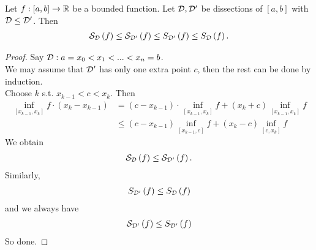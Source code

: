 \documentclass[a4paper]{article}
\begin{document}
\begin{lemma}
Let $f:\left[a,b\right]\to \mathbb{R}$ be a bounded function. Let $\mathcal{D},\mathcal{D}'$ be dissections of $[a,b]$ with $\mathcal{D} \leq \mathcal{D}'$. Then
\begin{equation*}
\begin{aligned}
\mathcal{S}_{\mathcal{D}}\left(f\right) \leq \mathcal{S}_{\mathcal{D}'}\left(f\right) \leq S_{\mathcal{D}'}\left(f\right) \leq S_{\mathcal{D}}\left(f\right).
\end{aligned}
\end{equation*}
\begin{proof}
Say $\mathcal{D}: a=x_0 < x_1 < ... < x_n = b$.\\
We may assume that $\mathcal{D}'$ has only one extra point $c$, then the rest can be done by induction.\\
Choose $k$ s.t. $x_{k-1} < c < x_k$. Then
\begin{equation*}
\begin{aligned}
\inf_{\left[x_{k-1},x_k\right]} f \cdot \left(x_k - x_{k-1}\right) &= \left(c-x_{k-1}\right) \cdot \inf_{\left[x_{k-1},x_k\right]} f + \left(x_k+c\right)\inf_{\left[x_{k-1},x_k\right]} f\\
&\leq \left(c-x_{k-1}\right) \inf_{\left[x_{k-1},c\right]}  f + \left(x_k-c\right) \inf_{\left[c,x_k\right]} f
\end{aligned}
\end{equation*}
We obtain
\begin{equation*}
\begin{aligned}
\mathcal{S}_{\mathcal{D}}\left(f\right) \leq \mathcal{S}_{\mathcal{D}'} \left(f\right).
\end{aligned}
\end{equation*}
Similarly,
\begin{equation*}
\begin{aligned}
S_{\mathcal{D}'}\left(f\right) \leq S_{\mathcal{D}} \left(f\right)
\end{aligned}
\end{equation*}
and we always have
\begin{equation*}
\begin{aligned}
\mathcal{S}_{\mathcal{D}'} \left(f\right) \leq S_{\mathcal{D}'} \left(f\right)
\end{aligned}
\end{equation*}
So done.
\end{proof}
\end{lemma}
\end{document}
